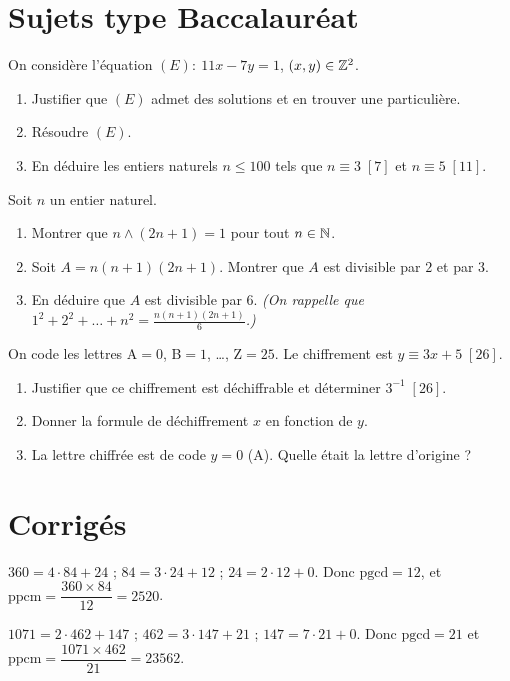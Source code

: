\section{Sujets type Baccalauréat}

On considère l'équation $(E):\ 11x-7y=1$, $(x,y)\in\mathbb{Z}^2$.
\begin{enumerate}[label=\arabic*)]
\item Justifier que $(E)$ admet des solutions et en trouver une particulière.
\item Résoudre $(E)$.
\item En déduire les entiers naturels $n\le 100$ tels que $n\equiv3\;[7]$ et $n\equiv5\;[11]$.
\end{enumerate}

Soit $n$ un entier naturel.
\begin{enumerate}[label=\arabic*)]
\item Montrer que $n\wedge(2n+1)=1$ pour tout $n\in\mathbb{N}$.
\item Soit $A=n(n+1)(2n+1)$. Montrer que $A$ est divisible par $2$ et par $3$.
\item En déduire que $A$ est divisible par $6$. \emph{(On rappelle que $1^2+2^2+\dots+n^2=\frac{n(n+1)(2n+1)}{6}$.)}
\end{enumerate}

On code les lettres A$=0$, B$=1$, \dots, Z$=25$. Le chiffrement est $y\equiv3x+5\;[26]$.
\begin{enumerate}[label=\arabic*)]
\item Justifier que ce chiffrement est déchiffrable et déterminer $3^{-1}\;[26]$.
\item Donner la formule de déchiffrement $x$ en fonction de $y$.
\item La lettre chiffrée est de code $y=0$ (A). Quelle était la lettre d'origine ?
\end{enumerate}

\section{Corrigés}

$360=4\cdot84+24$ ; $84=3\cdot24+12$ ; $24=2\cdot12+0$. Donc $\mathrm{pgcd}=12$, et
$\mathrm{ppcm}=\dfrac{360\times84}{12}=2520$.

$1071=2\cdot462+147$ ; $462=3\cdot147+21$ ; $147=7\cdot21+0$. Donc $\mathrm{pgcd}=21$ et
$\mathrm{ppcm}=\dfrac{1071\times462}{21}=23562$.

